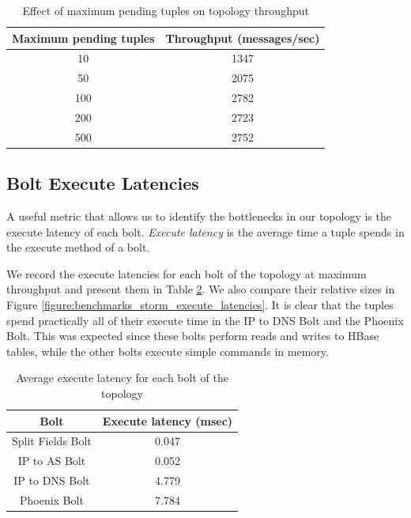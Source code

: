 \begin{table}[h!]
\centering
\begin{tabular}{ |c|c| }
\hline
Maximum pending tuples & Throughput (messages/sec) \\ \hline \hline
10 & 1347 \\ \hline
50 & 2075 \\ \hline
100 & 2782 \\ \hline
200 & 2723 \\ \hline
500 & 2752 \\ \hline
\end{tabular}
\caption{Effect of maximum pending tuples on topology throughput}
\label{table:max_pending_tuples}
\end{table}

\subsection{Bolt Execute Latencies}

A useful metric that allows us to identify the bottlenecks in our topology is the execute latency of each bolt. \emph{Execute latency} is the average time a tuple spends in the execute method of a bolt. 

We record the execute latencies for each bolt of the topology at maximum throughput and present them in Table \ref{table:execute_latencies}. We also compare their relative sizes in Figure \ref{figure:benchmarks_storm_execute_latencies}. It is clear that the tuples spend practically all of their execute time in the IP to DNS Bolt and the Phoenix Bolt. This was expected since these bolts perform reads and writes to HBase tables, while the other bolts execute simple commands in memory.

\begin{table}[h!]
\centering
\begin{tabular}{ |c|c| }
\hline
Bolt & Execute latency (msec) \\ \hline \hline
Split Fields Bolt & 0.047 \\ \hline
IP to AS Bolt & 0.052 \\ \hline
IP to DNS Bolt & 4.779 \\ \hline
Phoenix Bolt & 7.784 \\ \hline
\end{tabular}
\caption{Average execute latency for each bolt of the topology}
\label{table:execute_latencies}
\end{table}

